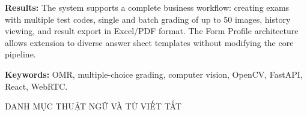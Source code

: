 \textbf{Results:} The system supports a complete business workflow: creating exams with multiple test codes, single and batch grading of up to 50 images, history viewing, and result export in Excel/PDF format. The Form Profile architecture allows extension to diverse answer sheet templates without modifying the core pipeline.

\textbf{Keywords:} OMR, multiple-choice grading, computer vision, OpenCV, FastAPI, React, WebRTC.

\clearpage
\tableofcontents
\newpage

\listoffigures
{}
\newpage

\listoftables
{}
\newpage

DANH MỤC THUẬT NGỮ VÀ TỪ VIẾT TẮT

